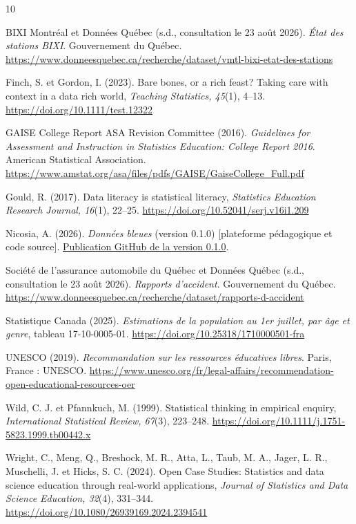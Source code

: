 \bigskip
\begin{thebibliography}{10}
\raggedright

 BIXI Montréal et Données Québec (s.d., consultation le 23 août 2026). \emph{État des stations BIXI}. Gouvernement du Québec. \url{https://www.donneesquebec.ca/recherche/dataset/vmtl-bixi-etat-des-stations}

 Finch, S. et Gordon, I. (2023). Bare bones, or a rich feast? Taking care with context in a data rich world, \emph{Teaching Statistics, 45}(1), 4--13. \url{https://doi.org/10.1111/test.12322}

 GAISE College Report ASA Revision Committee (2016). \emph{Guidelines for Assessment and Instruction in Statistics Education: College Report 2016}. American Statistical Association. \url{https://www.amstat.org/asa/files/pdfs/GAISE/GaiseCollege_Full.pdf}

 Gould, R. (2017). Data literacy is statistical literacy, \emph{Statistics Education Research Journal, 16}(1), 22--25. \url{https://doi.org/10.52041/serj.v16i1.209}

 Nicosia, A. (2026). \emph{Données bleues} (version 0.1.0) [plateforme pédagogique et code source]. \href{https://github.com/AurelienNicosiaULaval/donnees-bleues/releases/tag/v0.1.0}{Publication GitHub de la version 0.1.0}.

 Société de l'assurance automobile du Québec et Données Québec (s.d., consultation le 23 août 2026). \emph{Rapports d'accident}. Gouvernement du Québec. \url{https://www.donneesquebec.ca/recherche/dataset/rapports-d-accident}

 Statistique Canada (2025). \emph{Estimations de la population au 1er juillet, par âge et genre}, tableau 17-10-0005-01. \url{https://doi.org/10.25318/1710000501-fra}

 UNESCO (2019). \emph{Recommandation sur les ressources éducatives libres}. Paris, France : UNESCO. \url{https://www.unesco.org/fr/legal-affairs/recommendation-open-educational-resources-oer}

 Wild, C. J. et Pfannkuch, M. (1999). Statistical thinking in empirical enquiry, \emph{International Statistical Review, 67}(3), 223--248. \url{https://doi.org/10.1111/j.1751-5823.1999.tb00442.x}

 Wright, C., Meng, Q., Breshock, M. R., Atta, L., Taub, M. A., Jager, L. R., Muschelli, J. et Hicks, S. C. (2024). Open Case Studies: Statistics and data science education through real-world applications, \emph{Journal of Statistics and Data Science Education, 32}(4), 331--344. \url{https://doi.org/10.1080/26939169.2024.2394541}

\end{thebibliography}
